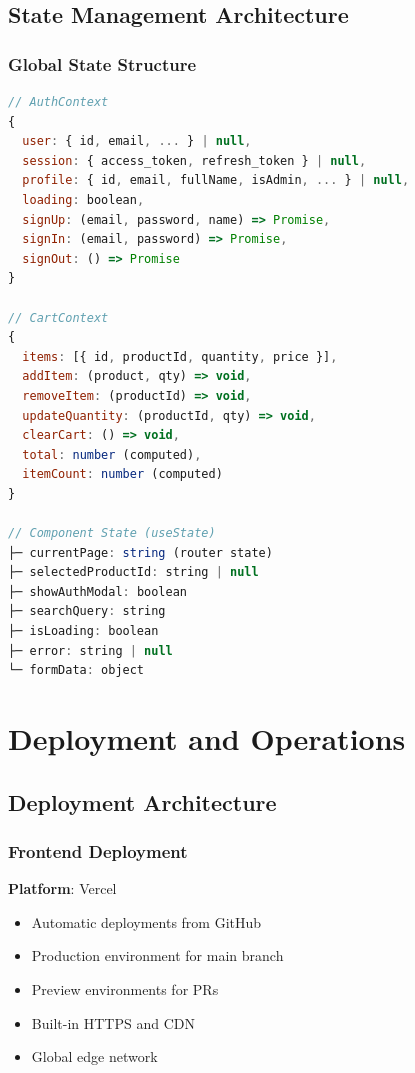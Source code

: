 \documentclass[12pt,a4paper]{report}
\begin{document}
\section{State Management Architecture}

\subsection{Global State Structure}

\begin{lstlisting}[language=javascript, caption=React Context State Management]
// AuthContext
{
  user: { id, email, ... } | null,
  session: { access_token, refresh_token } | null,
  profile: { id, email, fullName, isAdmin, ... } | null,
  loading: boolean,
  signUp: (email, password, name) => Promise,
  signIn: (email, password) => Promise,
  signOut: () => Promise
}

// CartContext
{
  items: [{ id, productId, quantity, price }],
  addItem: (product, qty) => void,
  removeItem: (productId) => void,
  updateQuantity: (productId, qty) => void,
  clearCart: () => void,
  total: number (computed),
  itemCount: number (computed)
}

// Component State (useState)
├─ currentPage: string (router state)
├─ selectedProductId: string | null
├─ showAuthModal: boolean
├─ searchQuery: string
├─ isLoading: boolean
├─ error: string | null
└─ formData: object
\end{lstlisting}

\newpage

\chapter{Deployment and Operations}

\section{Deployment Architecture}

\subsection{Frontend Deployment}

\textbf{Platform}: Vercel
\begin{itemize}
    \item Automatic deployments from GitHub
    \item Production environment for main branch
    \item Preview environments for PRs
    \item Built-in HTTPS and CDN
    \item Global edge network
\end{itemize}
\end{document}

